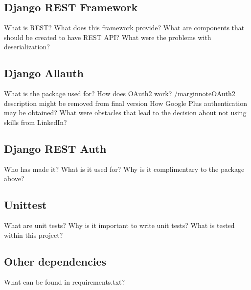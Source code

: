 \subsection{Django REST Framework}
What is REST?
What does this framework provide?
What are components that should be created to have REST API?
What were the problems with deserialization?

\subsection{Django Allauth}
What is the package used for?
How does OAuth2 work? /marginnote{OAuth2 description might be removed from final version}
How Google Plus authentication may be obtained?
What were obstacles that lead to the decision about not using skills from LinkedIn?

\subsection{Django REST Auth}
Who has made it? What is it used for? Why is it complimentary to the package above?

\subsection{Unittest}
What are unit tests?
Why is it important to write unit tests?
What is tested within this project?

\subsection{Other dependencies}
What can be found in requirements.txt? 



